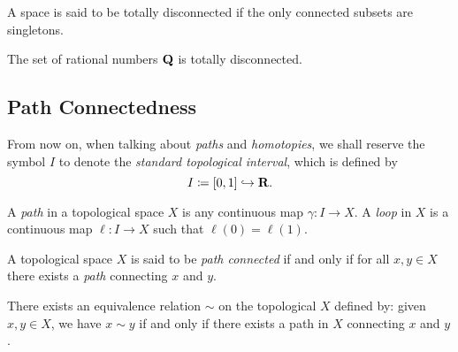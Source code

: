 \begin{definition}
\label{def:totally-disconnected}
A space is said to be totally disconnected if the only connected subsets are
singletons.
\end{definition}

\begin{example}
\label{exp:Q-is-totally-disconnected}
The set of rational numbers \(\mathbf{Q}\) is totally disconnected.
\end{example}

\subsection{Path Connectedness}

\begin{notation}
From now on, when talking about \emph{paths} and \emph{homotopies}, we shall
reserve the symbol \(I\) to denote the \emph{standard topological interval},
which is defined by
\[
  I \coloneq [0, 1] \hookrightarrow \mathbf{R}.
\]
\end{notation}

\begin{definition}
\label{def:path-loop}
A \emph{path} in a topological space \(X\) is any continuous map \(\gamma: I \to
X\). A \emph{loop} in \(X\) is a continuous map \(\ell: I \to X\) such that
\(\ell(0) = \ell(1)\).
\end{definition}

\begin{definition}
\label{def:path-connected}
A topological space \(X\) is said to be \emph{path connected} if and only if
for all \(x, y \in X\) there exists a \emph{path} connecting \(x\) and \(y\).
\end{definition}

\begin{proposition}
\label{prop:path-connected-equiv-relation}
There exists an equivalence relation \(\sim\) on the topological \(X\) defined
by: given \(x, y \in X\), we have \(x \sim y\) if and only if there exists a
path in \(X\) connecting \(x\) and \(y\).
\end{proposition}

